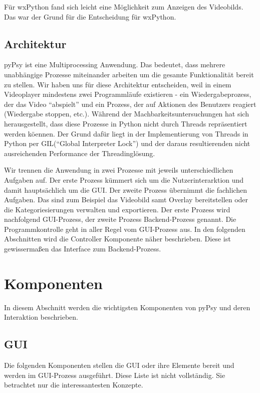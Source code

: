 \documentclass[a4paper,draft]{scrartcl}
\begin{document}
F\"ur wxPython fand sich leicht eine M\"oglichkeit zum Anzeigen des Videobilds.
Das war der Grund f\"ur die Entscheidung f\"ur wxPython.

\subsection{Architektur}
pyPsy ist eine Multiprocessing Anwendung.
Das bedeutet, dass mehrere unabh\"angige Prozesse miteinander arbeiten um die gesamte Funktionalit\"at bereit zu stellen.
Wir haben uns f\"ur diese Architektur entscheiden, weil in einem Videoplayer mindestens zwei Programml\"aufe existieren - ein Wiedergabeprozess, der das Video "`abspielt"' und ein Prozess, der auf Aktionen des Benutzers reagiert (Wiedergabe stoppen, etc.). W\"ahrend der Machbarkeitsuntersuchungen hat sich herausgestellt, dass diese Prozesse in Python nicht durch Threads repr\"asentiert werden k\"oennen.
Der Grund daf\"ur liegt in der Implementierung von Threads in Python per GIL("`Global Interpreter Lock"') und der daraus resultierenden nicht ausreichenden Performance der Threadingl\"osung.

Wir trennen die Anwendung in zwei Prozesse mit jeweils unterschiedlichen Aufgaben auf.
Der erste Prozess k\"ummert sich um die Nutzerinterarktion und damit haupts\"achlich um die GUI.
Der zweite Prozess \"ubernimmt die fachlichen Aufgaben. Das sind zum Beispiel das Videobild samt Overlay bereitstellen oder die Kategoriesierungen verwalten und exportieren.
Der erste Prozess wird nachfolgend GUI-Prozess, der zweite Prozess Backend-Prozess genannt.
Die Programmkontrolle geht in aller Regel vom GUI-Prozess aus.
In den folgenden Abschnitten wird die Controller Komponente n\"aher beschrieben.
Diese ist gewisserma\ss en das Interface zum Backend-Prozess.

\section{Komponenten}
In diesem Abschnitt werden die wichtigsten Komponenten von pyPsy und deren Interaktion beschrieben.

\subsection{GUI}
Die folgenden Komponenten stellen die GUI oder ihre Elemente bereit und werden im GUI-Prozess ausgef\"uhrt.
Diese Liste ist nicht vollst\"andig.
Sie betrachtet nur die interessantesten Konzepte.
\end{document}
